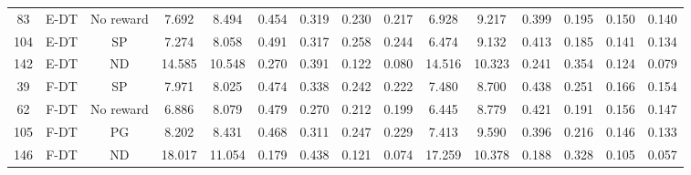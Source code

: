 \begin{table}
\begin{tabular}{@{\hskip3pt}c@{\hskip3pt}c@{\hskip3pt}c@{\hskip3pt}c@{\hskip3pt}c@{\hskip3pt}c@{\hskip3pt}c@{\hskip3pt}c@{\hskip3pt}c@{\hskip3pt}c@{\hskip3pt}c@{\hskip3pt}c@{\hskip3pt}c@{\hskip3pt}c@{\hskip3pt}c}
         83 &           E-DT &            No reward &             7.692 &       8.494 &         0.454 &       0.319 &       0.230 &        0.217 &               6.928 &       9.217 &         0.399 &       0.195 &       0.150 &        0.140 \\
        104 &           E-DT &                   SP &             7.274 &       8.058 &         0.491 &       0.317 &       0.258 &        0.244 &               6.474 &       9.132 &         0.413 &       0.185 &       0.141 &        0.134 \\
        142 &           E-DT &                   ND &            14.585 &      10.548 &         0.270 &       0.391 &       0.122 &        0.080 &              14.516 &      10.323 &         0.241 &       0.354 &       0.124 &        0.079 \\
         39 &           F-DT &                   SP &             7.971 &       8.025 &         0.474 &       0.338 &       0.242 &        0.222 &               7.480 &       8.700 &         0.438 &       0.251 &       0.166 &        0.154 \\
         62 &           F-DT &            No reward &             6.886 &       8.079 &         0.479 &       0.270 &       0.212 &        0.199 &               6.445 &       8.779 &         0.421 &       0.191 &       0.156 &        0.147 \\
        105 &           F-DT &                   PG &             8.202 &       8.431 &         0.468 &       0.311 &       0.247 &        0.229 &               7.413 &       9.590 &         0.396 &       0.216 &       0.146 &        0.133 \\
        146 &           F-DT &                   ND &            18.017 &      11.054 &         0.179 &       0.438 &       0.121 &        0.074 &              17.259 &      10.378 &         0.188 &       0.328 &       0.105 &        0.057 \\
\bottomrule
\end{tabular}
\end{table}

